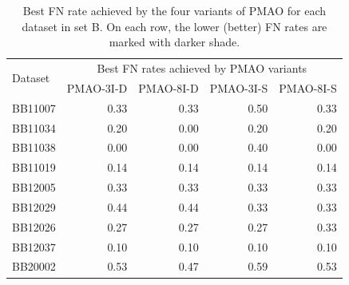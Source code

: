 \begin{table}[!htbp]
	\small
	\caption{Best FN rate achieved by the four variants of PMAO for each dataset in set B. On each row, the lower (better) FN rates are marked with darker shade.}
	\begin{tabular}{|l|r|r|r|r|}
		\hline
		\multirow{2}{*}{Dataset} & \multicolumn{4}{c|}{Best FN rates achieved by PMAO variants} \\
		\cline{2-5}          & \multicolumn{1}{l|}{PMAO-3I-D} & \multicolumn{1}{l|}{PMAO-8I-D} & \multicolumn{1}{l|}{PMAO-3I-S} & \multicolumn{1}{l|}{PMAO-8I-S} \\
		\hline
		BB11007 & \cellcolor[rgb]{ .384,  .745,  .478}0.33 & \cellcolor[rgb]{ .384,  .745,  .478}0.33 & \cellcolor[rgb]{ .988,  1,  .992}0.50 & \cellcolor[rgb]{ .384,  .745,  .478}0.33 \\
		\hline
		BB11034 & \cellcolor[rgb]{ .988,  1,  .992}0.20 & \cellcolor[rgb]{ .384,  .745,  .478}0.00 & \cellcolor[rgb]{ .988,  1,  .992}0.20 & \cellcolor[rgb]{ .988,  1,  .992}0.20 \\
		\hline
		BB11038 & \cellcolor[rgb]{ .384,  .745,  .478}0.00 & \cellcolor[rgb]{ .384,  .745,  .478}0.00 & \cellcolor[rgb]{ .988,  1,  .992}0.40 & \cellcolor[rgb]{ .384,  .745,  .478}0.00 \\
		\hline
		BB11019 & \cellcolor[rgb]{ .988,  1,  .992}0.14 & \cellcolor[rgb]{ .988,  1,  .992}0.14 & \cellcolor[rgb]{ .988,  1,  .992}0.14 & \cellcolor[rgb]{ .988,  1,  .992}0.14 \\
		\hline
		BB12005 & \cellcolor[rgb]{ .988,  1,  .992}0.33 & \cellcolor[rgb]{ .988,  1,  .992}0.33 & \cellcolor[rgb]{ .988,  1,  .992}0.33 & \cellcolor[rgb]{ .988,  1,  .992}0.33 \\
		\hline
		BB12029 & \cellcolor[rgb]{ .988,  1,  .992}0.44 & \cellcolor[rgb]{ .988,  1,  .992}0.44 & \cellcolor[rgb]{ .384,  .745,  .478}0.33 & \cellcolor[rgb]{ .384,  .745,  .478}0.33 \\
		\hline
		BB12026 & \cellcolor[rgb]{ .384,  .745,  .478}0.27 & \cellcolor[rgb]{ .384,  .745,  .478}0.27 & \cellcolor[rgb]{ .384,  .745,  .478}0.27 & \cellcolor[rgb]{ .988,  1,  .992}0.33 \\
		\hline
		BB12037 & \cellcolor[rgb]{ .988,  1,  .992}0.10 & \cellcolor[rgb]{ .988,  1,  .992}0.10 & \cellcolor[rgb]{ .988,  1,  .992}0.10 & \cellcolor[rgb]{ .988,  1,  .992}0.10 \\
		\hline
		BB20002 & \cellcolor[rgb]{ .686,  .871,  .733}0.53 & \cellcolor[rgb]{ .384,  .745,  .478}0.47 & \cellcolor[rgb]{ .988,  1,  .992}0.59 & \cellcolor[rgb]{ .686,  .871,  .733}0.53 \\

\end{tabular}
\end{table}
